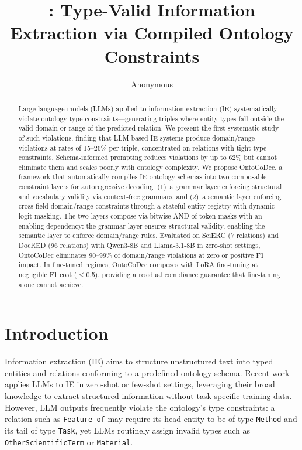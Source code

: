\documentclass[11pt,a4paper]{article}
\title{\sys{}: Type-Valid Information Extraction via Compiled Ontology Constraints}
\author{Anonymous}
\newcommand{\sys}{OntoCoDec}
\newcommand{\pp}{\text{pp}}
\begin{document}
\maketitle

\begin{abstract}
Large language models (LLMs) applied to information extraction (IE) systematically violate ontology type constraints---generating triples where entity types fall outside the valid domain or range of the predicted relation.
We present the first systematic study of such violations, finding that LLM-based IE systems produce domain/range violations at rates of 15--26\% per triple, concentrated on relations with tight type constraints.
Schema-informed prompting reduces violations by up to 62\% but cannot eliminate them and scales poorly with ontology complexity.
We propose \sys{}, a framework that automatically compiles IE ontology schemas into two composable constraint layers for autoregressive decoding: (1)~a grammar layer enforcing structural and vocabulary validity via context-free grammars, and (2)~a semantic layer enforcing cross-field domain/range constraints through a stateful entity registry with dynamic logit masking.
The two layers compose via bitwise AND of token masks with an enabling dependency: the grammar layer ensures structural validity, enabling the semantic layer to enforce domain/range rules.
Evaluated on SciERC (7 relations) and DocRED (96 relations) with Qwen3-8B and Llama-3.1-8B in zero-shot settings, \sys{} eliminates 90--99\% of domain/range violations at zero or positive F1 impact.
In fine-tuned regimes, \sys{} composes with LoRA fine-tuning at negligible F1 cost ($\leq$0.5\pp{}), providing a residual compliance guarantee that fine-tuning alone cannot achieve.
\end{abstract}

\section{Introduction}
\label{sec:intro}

Information extraction (IE) aims to structure unstructured text into typed entities and relations conforming to a predefined ontology schema.
Recent work applies LLMs to IE in zero-shot or few-shot settings, leveraging their broad knowledge to extract structured information without task-specific training data.
However, LLM outputs frequently violate the ontology's type constraints: a relation such as \texttt{Feature-of} may require its head entity to be of type \texttt{Method} and its tail of type \texttt{Task}, yet LLMs routinely assign invalid types such as \texttt{OtherScientificTerm} or \texttt{Material}.
\end{document}
